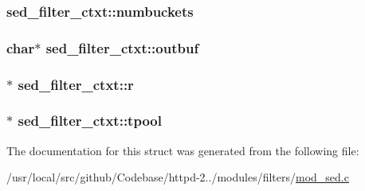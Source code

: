 \subsubsection[{\texorpdfstring{numbuckets}{numbuckets}}]{ sed\+\_\+filter\+\_\+ctxt\+::numbuckets}\hypertarget{structsed__filter__ctxt_a686087aebd42d5c1e81565a1d677486e}{}\label{structsed__filter__ctxt_a686087aebd42d5c1e81565a1d677486e}
\subsubsection[{\texorpdfstring{outbuf}{outbuf}}]{\setlength{\rightskip}{0pt plus 5cm}char$\ast$ sed\+\_\+filter\+\_\+ctxt\+::outbuf}\hypertarget{structsed__filter__ctxt_a46da5cbcfef5f9fbb46631615c8e6819}{}\label{structsed__filter__ctxt_a46da5cbcfef5f9fbb46631615c8e6819}
\subsubsection[{\texorpdfstring{r}{r}}]{$\ast$ sed\+\_\+filter\+\_\+ctxt\+::r}\hypertarget{structsed__filter__ctxt_adee4c54aa441589086e554225da086f8}{}\label{structsed__filter__ctxt_adee4c54aa441589086e554225da086f8}
\subsubsection[{\texorpdfstring{tpool}{tpool}}]{$\ast$ sed\+\_\+filter\+\_\+ctxt\+::tpool}\hypertarget{structsed__filter__ctxt_a8de2d80895b2336d2893681b7b74981b}{}\label{structsed__filter__ctxt_a8de2d80895b2336d2893681b7b74981b}


The documentation for this struct was generated from the following file\+:\begin{DoxyCompactItemize}
\item 
/usr/local/src/github/\+Codebase/httpd-\/2../modules/filters/\hyperlink{mod__sed_8c}{mod\+\_\+sed.\+c}\end{DoxyCompactItemize}
